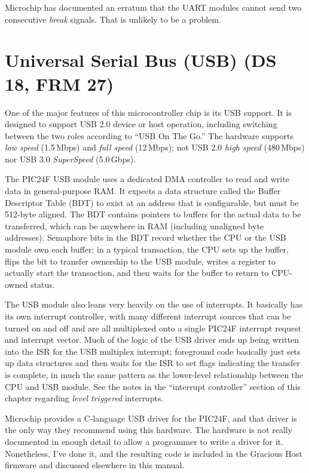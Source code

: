 Microchip has documented an erratum that the UART modules cannot send two
consecutive \emph{break} signals.  That is unlikely to be a problem.


\section{Universal Serial Bus (USB) (DS 18, FRM 27)}

One of the major features of this microcontroller chip is its USB support. 
It is designed to support USB 2.0 device or host operation, including
switching between the two roles according to ``USB On The Go.'' The hardware
supports \emph{low speed} (1.5\,Mbps) and \emph{full speed} (12\,Mbps); not
USB 2.0 \emph{high speed} (480\,Mbps) nor USB 3.0 \emph{SuperSpeed}
(5.0\,Gbps).

The PIC24F USB module uses a dedicated DMA controller to read and write data
in general-purpose RAM.  It expects a data structure called the Buffer
Descriptor Table (BDT) to exist at an address that is configurable, but must
be 512-byte aligned.  The BDT contains pointers to buffers for the actual
data to be transferred, which can be anywhere in RAM (including unaligned
byte addresses).  Semaphore bits in the BDT record whether the CPU or the
USB module own each buffer; in a typical transaction, the CPU sets up the
buffer, flips the bit to transfer ownership to the USB module, writes a
register to actually start the transaction, and then waits for the buffer to
return to CPU-owned status.

The USB module also leans very heavily on the use of interrupts.  It
basically has its own interrupt controller, with many different interrupt
sources that can be turned on and off and are all multiplexed onto a single
PIC24F interrupt request and interrupt vector.  Much of the logic of the USB
driver ends up being written into the ISR for the USB multiplex interrupt;
foreground code basically just sets up data structures and then waits for
the ISR to set flags indicating the transfer is complete, in much the same
pattern as the lower-level relationship between the CPU and USB module.  See
the notes in the ``interrupt controller'' section of this chapter regarding
\emph{level triggered} interrupts.

Microchip provides a C-language USB driver for the PIC24F, and that driver
is the only way they recommend using this hardware.  The hardware is not
really documented in enough detail to allow a programmer to write a driver
for it.  Nonetheless, I've done it, and the resulting code is included in
the Gracious Host firmware and discussed elsewhere in this manual.

